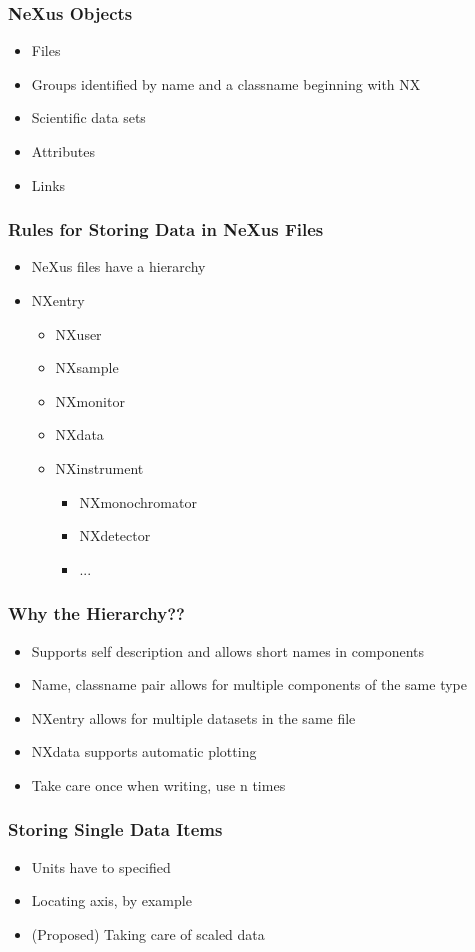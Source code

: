\documentclass{beamer}
\begin{document}
\begin{frame} \frametitle{NeXus Objects}
\begin{itemize}
\item Files
\item Groups identified by name and a classname beginning with NX
\item Scientific data sets
\item Attributes
\item Links
\end{itemize}
\end{frame}

\begin{frame} \frametitle{Rules for Storing Data in NeXus Files}
\begin{itemize}
\item NeXus files have a hierarchy
\item NXentry
\begin{itemize}\item NXuser
\item NXsample
\item NXmonitor
\item NXdata
\item NXinstrument
\begin{itemize}\item NXmonochromator
\item NXdetector
\item ...
\end{itemize}\end{itemize}
\end{itemize}
\end{frame}

\begin{frame} \frametitle{Why the Hierarchy??}
\begin{itemize}
\item<1->Supports self description and allows short names in components
\item<2->Name, classname pair allows for multiple components of the same type
\item<3->NXentry allows for multiple datasets in the same file
\item<4->NXdata supports automatic plotting
\item<5->Take care once when writing, use n times
\end{itemize}
\end{frame}


\begin{frame} \frametitle{Storing Single Data Items }
\begin{itemize}
\item Units have to specified
\item Locating axis, by example
\item (Proposed) Taking care of scaled data
\end{itemize}
\end{frame}
\end{document}
